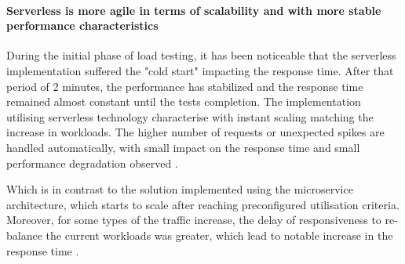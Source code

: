 
\paragraph*{Serverless is more agile in terms of scalability and with more stable performance characteristics}

During the initial phase of load testing, it has been noticeable that the serverless implementation suffered the "cold start" impacting the response time.
After that period of 2 minutes, the performance has stabilized and the response time remained almost constant until the tests completion.
The implementation utilising serverless technology characterise with instant scaling matching the increase in workloads.
The higher number of requests or unexpected spikes are handled automatically, with small impact on the response time and small performance degradation observed \cite{ServerlessComputingAnInvestigationOfDeploymentEnvironmentsForWebAPIs}.

Which is in contrast to the solution implemented using the microservice architecture, which starts to scale after reaching preconfigured utilisation criteria.
Moreover, for some types of the traffic increase, the delay of responsiveness to re-balance the current workloads was greater, which lead to notable increase in the response time \cite{MicroservicesvsServerlessAPerformanceComparisonOnCloudNativeWebApplication}.




